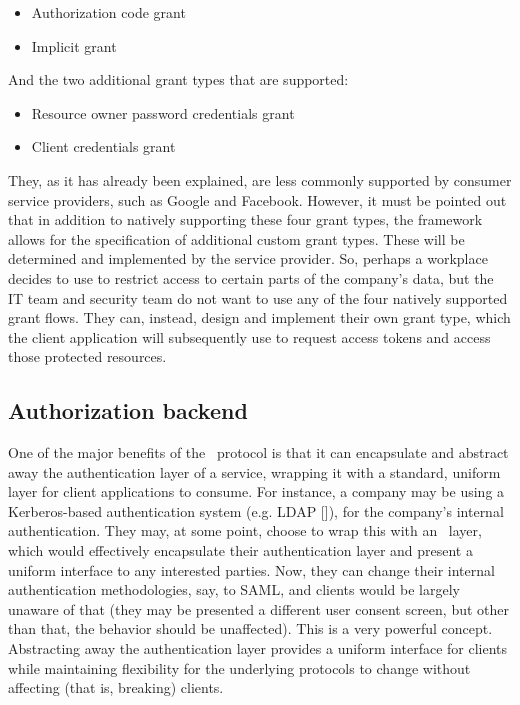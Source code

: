 \begin{itemize}
    \item Authorization code grant
    \item Implicit grant
\end{itemize}

\noindent And the two additional grant types that are supported:

\begin{itemize}
    \item Resource owner password credentials grant
    \item Client credentials grant
\end{itemize}

\noindent They, as it has already been explained, are less commonly supported by consumer service providers, such as Google and Facebook. However, it must be pointed out that in addition to natively supporting these four grant types, the \textit{\oauth} framework allows for the specification of additional custom grant types. These will be determined and implemented by the service provider. So, perhaps a workplace decides to use \textit{\oauth} to restrict access to certain parts of the company's data, but the IT team and security team do not want to use any of the four natively supported grant flows. They can, instead, design and implement their own grant type, which the client application will subsequently use to request access tokens and access those protected resources.

\subsection{Authorization backend}
One of the major benefits of the \oauth\ protocol is that it can encapsulate and abstract away the authentication layer of a service, wrapping it with a standard, uniform layer for client applications to consume. For instance, a company may be using a Kerberos-based authentication system (e.g. LDAP []), for the company's internal authentication. They may, at some point, choose to wrap this with an \oauth\ layer, which would effectively encapsulate their authentication layer and present a uniform interface to any interested parties. Now, they can change their internal authentication methodologies, say, to SAML, and clients would be largely unaware of that (they may be presented a different user consent screen, but other than that, the behavior should be unaffected). This is a very powerful concept. Abstracting away the authentication layer provides a uniform interface for clients while maintaining flexibility for the underlying protocols to change without affecting (that is, breaking) clients.

